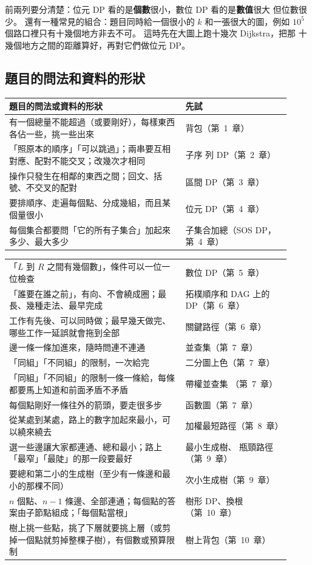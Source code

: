 前兩列要分清楚：位元 DP 看的是\textbf{個數}很小，數位 DP 看的是\textbf{數值}很大
但位數很少。 還有一種常見的組合：題目同時給一個很小的 $k$ 和一張很大的圖，例如
$10^5$ 個路口裡只有十幾個地方非去不可。 這時先在大圖上跑十幾次 Dijkstra，把那
十幾個地方之間的距離算好，再對它們做位元 DP。

\subsection{題目的問法和資料的形狀}

\begin{center}
\begin{tabular}{p{0.58\linewidth}p{0.34\linewidth}}
\toprule
題目的問法或資料的形狀 & 先試 \\
\midrule
有一個總量不能超過（或要剛好），每樣東西各佔一些，挑一些出來 & 背包（第~1~章） \\
「照原本的順序」「可以跳過」；兩串要互相對應、配對不能交叉；改幾次才相同 & 子序
列 DP（第~2~章） \\
操作只發生在相鄰的東西之間；回文、括號、不交叉的配對 & 區間 DP（第~3~章） \\
要排順序、走遍每個點、分成幾組，而且某個量很小 & 位元 DP（第~4~章） \\
每個集合都要問「它的所有子集合」加起來多少、最大多少 & 子集合加總（SOS DP，第~4~章） \\
\end{tabular}

\begin{tabular}{p{0.58\linewidth}p{0.34\linewidth}}
「$L$ 到 $R$ 之間有幾個數」，條件可以一位一位檢查 & 數位 DP（第~5~章） \\
「誰要在誰之前」，有向、不會繞成圈；最長、幾種走法、最早完成 & 拓樸順序和 DAG
上的 DP（第~6~章） \\
工作有先後、可以同時做；最早幾天做完、哪些工作一延誤就會拖到全部 & 關鍵路徑（第~6~章） \\
邊一條一條加進來，隨時問連不連通 & 並查集（第~7~章） \\
「同組」「不同組」的限制，一次給完 & 二分圖上色（第~7~章） \\
「同組」「不同組」的限制一條一條給，每條都要馬上知道和前面矛盾不矛盾 & 帶權並查集
（第~7~章） \\
每個點剛好一條往外的箭頭，要走很多步 & 函數圖（第~7~章） \\
從某處到某處，路上的數字加起來最小，可以繞來繞去 & 加權最短路徑（第~8~章） \\
選一些邊讓大家都連通、總和最小；路上「最窄」「最陡」的那一段要最好 & 最小生成樹、
瓶頸路徑（第~9~章） \\
要總和第二小的生成樹（至少有一條邊和最小的那棵不同） & 次小生成樹（第~9~章） \\
$n$ 個點、$n - 1$ 條邊、全部連通；每個點的答案由子節點組成；「每個點當根」 & 樹形
DP、換根（第~10~章） \\
樹上挑一些點，挑了下層就要挑上層（或剪掉一個點就剪掉整棵子樹），有個數或預算限制
& 樹上背包（第~10~章） \\
\bottomrule
\end{tabular}
\end{center}

